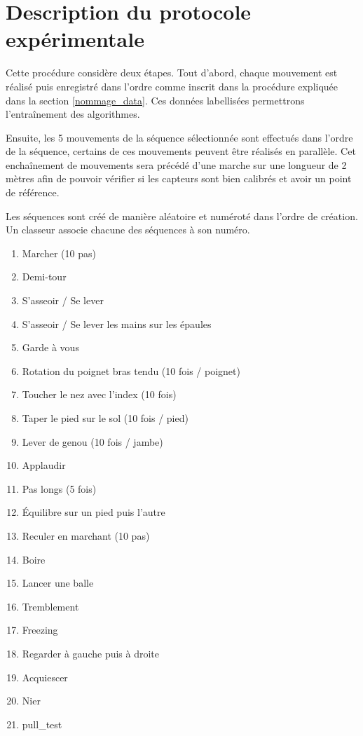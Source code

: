 \documentclass{article}
\begin{document}
\section{Description du protocole expérimentale}
\label{protocole}

Cette procédure considère deux étapes. Tout d'abord, chaque mouvement est réalisé puis enregistré dans l'ordre comme inscrit dans la procédure expliquée dans la section \ref{nommage_data}. Ces données labellisées permettrons l'entraînement des algorithmes.

Ensuite, les 5 mouvements de la séquence sélectionnée sont effectués dans l'ordre de la séquence, certains de ces mouvements peuvent être réalisés en parallèle. Cet enchaînement de mouvements sera précédé d'une marche sur une longueur de 2 mètres afin de pouvoir vérifier si les capteurs sont bien calibrés et avoir un point de référence.

Les séquences sont créé de manière aléatoire et numéroté dans l'ordre de création. Un classeur associe chacune des séquences à son numéro.

\begin{enumerate}
	\item Marcher (10 pas)
	\item Demi-tour
	\item S'asseoir / Se lever
	\item S'asseoir / Se lever les mains sur les épaules
	\item Garde à vous
	\item Rotation du poignet bras tendu (10 fois / poignet)
	\item Toucher le nez avec l'index (10 fois)
	\item Taper le pied sur le sol (10 fois / pied)
	\item Lever de genou (10 fois / jambe)
	\item Applaudir
	\item Pas longs (5 fois)
	\item Équilibre sur un pied puis l'autre
	\item Reculer en marchant (10 pas)
	\item Boire
	\item Lancer une balle
	\item Tremblement
	\item Freezing
	\item Regarder à gauche puis à droite
	\item Acquiescer
	\item Nier
	\item \Gls{pull_test}
\end{enumerate}
\end{document}
